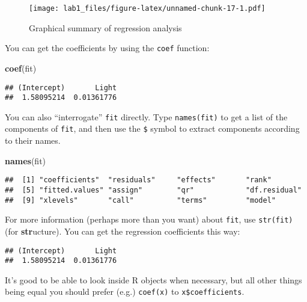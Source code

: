 \documentclass[11pt,]{article}
\newenvironment{Shaded}{\begin{snugshade}}{\end{snugshade}}
\newcommand{\KeywordTok}[1]{\textcolor[rgb]{0.13,0.29,0.53}{\textbf{#1}}}
\newcommand{\OperatorTok}[1]{\textcolor[rgb]{0.81,0.36,0.00}{\textbf{#1}}}
\newcommand{\NormalTok}[1]{#1}
\begin{document}
\begin{figure}
\centering
\texttt{[image: lab1\_files/figure-latex/unnamed-chunk-17-1.pdf]}
\caption{Graphical summary of regression analysis}
\end{figure}

You can get the coefficients by using the \texttt{coef} function:

\begin{Shaded}
\begin{Highlighting}[]
\KeywordTok{coef}\NormalTok{(fit)}
\end{Highlighting}
\end{Shaded}

\begin{verbatim}
## (Intercept)       Light 
##  1.58095214  0.01361776
\end{verbatim}

You can also ``interrogate'' \texttt{fit} directly. Type
\texttt{names(fit)} to get a list of the components of \texttt{fit}, and
then use the \texttt{\$} symbol to extract components according to their
names.

\begin{Shaded}
\begin{Highlighting}[]
\KeywordTok{names}\NormalTok{(fit)}
\end{Highlighting}
\end{Shaded}

\begin{verbatim}
##  [1] "coefficients"  "residuals"     "effects"       "rank"         
##  [5] "fitted.values" "assign"        "qr"            "df.residual"  
##  [9] "xlevels"       "call"          "terms"         "model"
\end{verbatim}

For more information (perhaps more than you want) about \texttt{fit},
use \texttt{str(fit)} (for \textbf{str}ucture). You can get the
regression coefficients this way:

\begin{Shaded}
\end{Shaded}

\begin{verbatim}
## (Intercept)       Light 
##  1.58095214  0.01361776
\end{verbatim}

It's good to be able to look inside R objects when necessary, but all
other things being equal you should prefer (e.g.) \texttt{coef(x)} to
\texttt{x\$coefficients}.
\end{document}
